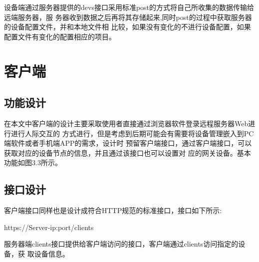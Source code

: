 \documentclass[a4paper,12pt]{report}
\begin{document}
\begin{spacing}{1.5}
设备端通过服务器提供的devs接口采用标准post的方式将自己所收集的数据传输给远端服务器，服
务器收到数据之后再将其存储起来,同时post的过程中获取服务器的设备配置文件，并和本地文件相
比较，如果没有变化的不进行设备配置，如果配置文件有变化的配置相应的项目。

\section{客户端}
\subsection{功能设计}
在本文中客户端的设计主要采取使用者直接通过浏览器软件登录远程服务器Web进行进行人际交互的
方式进行，但是考虑到后期可能会有需要将设备管理嵌入到PC端软件或者手机端APP的需求，设计时
预留客户端接口，通过客户端接口，可以获取对应的设备节点的信息，并且通过该接口也可以设置对
应的网关设备。基本功能如图3.3所示。

\subsection{接口设计}
客户端接口同样也是设计成符合HTTP规范的标准接口，接口如下所示:
\begin{tcolorbox}[notitle,boxrule=0pt,colback=blue!20,colframe=blue!20]
    \quad https://Server-ip:port/clients
\end{tcolorbox}
服务器端clients接口提供给客户端访问的接口，客户端通过clients访问指定的设备，获
取设备信息。
\end{spacing}

\end{document}
